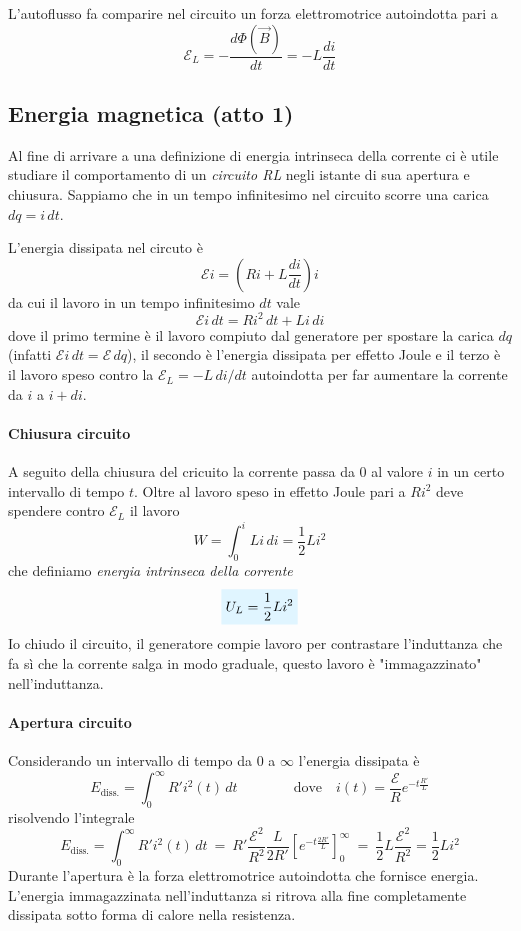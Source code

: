 \documentclass[x11names]{report}
\begin{document}
L'autoflusso fa comparire nel circuito un forza elettromotrice autoindotta pari a 
\[
\mathcal{E}_L= - \frac{d\Phi(\vec{B})}{dt} = - L\frac{di}{dt}
\]

\subsection{Energia magnetica (atto 1)}
Al fine di arrivare a una definizione di energia intrinseca della corrente ci è utile studiare il comportamento di un \textit{circuito RL} negli istante di sua apertura e chiusura. Sappiamo che in un tempo infinitesimo nel circuito scorre una carica \(dq = i \, dt\).

L'energia dissipata nel circuto è
\[
\mathcal{E}i = \left(Ri + L\frac{di}{dt}\right)i
\]
da cui il lavoro in un tempo infinitesimo \(dt\) vale
\[
\mathcal{E}i \, dt = Ri^2 \, dt + Li \, di
\]
dove il primo termine è il lavoro compiuto dal generatore per spostare la carica \(dq\) (infatti \(\mathcal{E}i \, dt  = \mathcal{E} \, dq \)), il secondo è l'energia dissipata per effetto Joule e il terzo è il lavoro speso contro la \(\mathcal{E}_L = -L \, di/dt\) autoindotta per far aumentare la corrente da \(i\) a \(i + di\).

\paragraph{Chiusura circuito} A seguito della chiusura del cricuito la corrente passa da \(0\) al valore \(i\) in un certo intervallo di tempo \(t\). Oltre al lavoro speso in effetto Joule pari a \(Ri^2\) deve spendere contro \(\mathcal{E}_L\) il lavoro
\[
W = \int_{0}^{i}Li \, di = \frac{1}{2}Li^2
\]
che definiamo \textit{energia intrinseca della corrente}
\begin{equation}
	\viola{U_L = \frac{1}{2}Li^2}
\end{equation}
Io chiudo il circuito, il generatore compie lavoro per contrastare l'induttanza che fa sì che la corrente salga in modo graduale, questo lavoro è "immagazzinato" nell'induttanza.

\paragraph{Apertura circuito} 
Considerando un intervallo di tempo da \(0\) a \(\infty\) l'energia dissipata è 
\[
E_{\text{diss.}} = \int_{0}^{\infty} R'i^2(t) \, dt \qquad \qquad \text{dove} \quad i(t) = \frac{\mathcal{E}}{R}e^{-t\frac{R'}{L}} 
\]
risolvendo l'integrale
\[
 E_{\text{diss.}} = \int_{0}^{\infty} R'i^2(t) \, dt \: = \: R'\frac{\mathcal{E}^2}{R^2} \frac{L}{2R'}\left[e^{-t\frac{2R'}{L}}\right]_0^\infty \: = \: \frac{1}{2}L\frac{\mathcal{E}^2}{R^2} = \frac{1}{2}Li^2
\]
Durante l'apertura è la forza elettromotrice autoindotta che fornisce energia. L'energia immagazzinata nell'induttanza si ritrova alla fine completamente dissipata sotto forma di calore nella resistenza.
\end{document}
